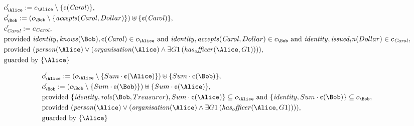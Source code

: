 \begin{align*}
&
c'_
{
\Alice
}
 := 
c_
{
\Alice
}
 \setminus 
\{
\text{\textcent}
(
\mathit{Carol}
)
\}
,\\
&
c'_
{
\Bob
}
 := 
(c_
{
\Bob
}
 \setminus 
\{
\mathit{
accepts
}
(
\mathit{Carol}
,
Dollar
)
\}
) \uplus 
\{
\text{\textcent}
(
\mathit{Carol}
)
\}
,\\
&
c'_
{
\mathit{Carol}
}
 := 
c_
{
\mathit{Carol}
}
,\\
&
\text{provided } 
\mathit{
identity
}
,
\mathit{
knows
}
(
\Bob
)
,
\text{\textcent}
(
\mathit{Carol}
)
 \in c_
{
\Alice
}
 \text{ and } 
\mathit{
identity
}
,
\mathit{
accepts
}
(
\mathit{Carol}
,
Dollar
)
 \in c_
{
\Bob
}
 \text{ and } 
\mathit{
identity
}
,
\mathit{
issued_in
}
(
Dollar
)
 \in c_
{
\mathit{Carol}
}
,\\
&
\text{provided } 
(
\mathit{
person
}
(
\Alice
)
\lor
(
\mathit{
organisation
}
(
\Alice
)
\land
\exists 
G1
\,(
\mathit{
has_officer
}
(
\Alice
,
G1
)
)
)
)
,\\
&
\text{guarded by } \{
\Alice
\}
\end{align*}

\begin{align*}
&
c'_
{
\Alice
}
 := 
(c_
{
\Alice
}
 \setminus 
\{
Sum
\cdot
\text{\textcent}
(
\Alice
)
\}
) \uplus 
\{
Sum
\cdot
\text{\textcent}
(
\Bob
)
\}
,\\
&
c'_
{
\Bob
}
 := 
(c_
{
\Bob
}
 \setminus 
\{
Sum
\cdot
\text{\textcent}
(
\Bob
)
\}
) \uplus 
\{
Sum
\cdot
\text{\textcent}
(
\Alice
)
\}
,\\
&
\text{provided } 
\{
\mathit{
identity
}
,
\mathit{
role
}
(
\Bob
,
Treasurer
)
,
Sum
\cdot
\text{\textcent}
(
\Alice
)
\}
 \subseteq c_
{
\Alice
}
 \text{ and } 
\{
\mathit{
identity
}
,
Sum
\cdot
\text{\textcent}
(
\Bob
)
\}
 \subseteq c_
{
\Bob
}
,\\
&
\text{provided } 
(
\mathit{
person
}
(
\Alice
)
\lor
(
\mathit{
organisation
}
(
\Alice
)
\land
\exists 
G1
\,(
\mathit{
has_officer
}
(
\Alice
,
G1
)
)
)
)
,\\
&
\text{guarded by } \{
\Alice
\}
\end{align*}
